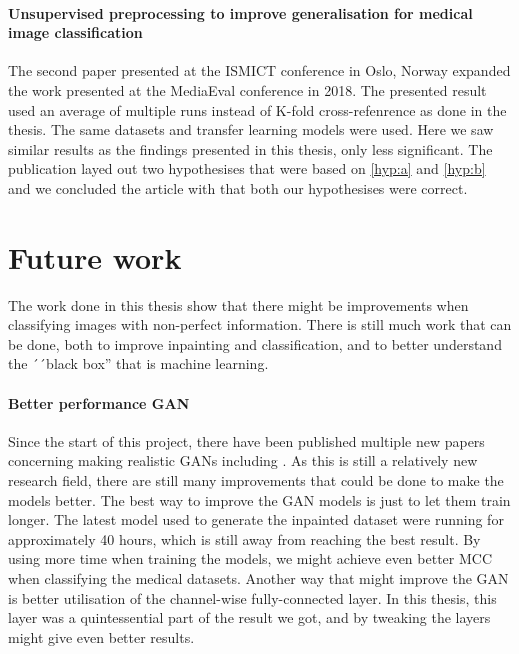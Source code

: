 \paragraph{Unsupervised preprocessing to improve generalisation for medical image classification~\cite{Mathias2019IEEpaper}}
The second paper presented at the ISMICT conference in Oslo, Norway expanded the work presented at the MediaEval conference in 2018.
The presented result used an average of multiple runs instead of K-fold cross-refenrence as done in the thesis. The same datasets and transfer learning models were used.
Here we saw similar results as the findings presented in this thesis, only less significant. The publication layed out two hypothesises that were based on \ref{hyp:a} and \ref{hyp:b} and we concluded the article with that both our hypothesises were correct. 








\section{Future work}
The work done in this thesis show that there might be improvements when classifying images with non-perfect information. There is still much work that can be done, both to improve inpainting and classification, and to better understand the ´´black box'' that is machine learning. 

\paragraph{Better performance GAN}
Since the start of this project, there have been published multiple new papers concerning making realistic GANs including \cite{DBLP:journals/corr/abs-1809-11096} \cite{DBLP:journals/corr/abs-1812-04948}. As this is still a relatively new research field, there are still many improvements that could be done to make the models better.
The best way to improve the GAN models is just to let them train longer. The latest model used to generate the inpainted dataset were running for approximately 40 hours, which is still away from reaching the best result. By using more time when training the models, we might achieve even better MCC when classifying the medical datasets.
Another way that might improve the GAN is better utilisation of the channel-wise fully-connected layer. In this thesis, this layer was a quintessential part of the result we got, and by tweaking the layers might give even better results.

